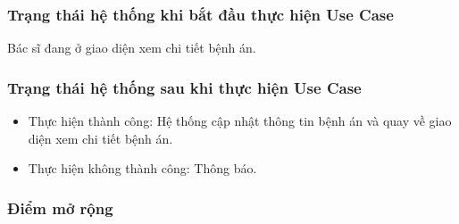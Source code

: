 \subsubsection{Trạng thái hệ thống khi bắt đầu thực hiện Use Case}
Bác sĩ đang ở giao diện xem chi tiết bệnh án.

\subsubsection{Trạng thái hệ thống sau khi thực hiện Use Case}
\begin{itemize}
  \item Thực hiện thành công: Hệ thống cập nhật thông tin bệnh án và quay về giao diện xem chi tiết bệnh án.
  \item Thực hiện không thành công: Thông báo.
\end{itemize}

\subsubsection{Điểm mở rộng}